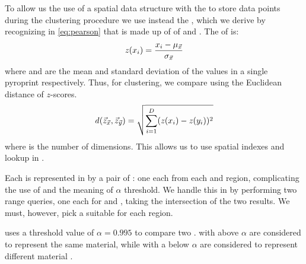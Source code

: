 To allow us the use of a spatial data structure with the \pearson{} to store data points during the clustering procedure we use instead the \clustplop{}, which we derive by recognizing in \autoref{eq:pearson} that \pearson{} is made up of \zscores{} of \pcveca{} and \pcvecb{}. 
The \zscore{} of \pcveca{} is:
\[
 \mathit{z}{}(x_i) = \frac{x_i - \mu_{\vec{x}}}{\sigma_{\vec{x}}}
\]
where \vecavg{\pca} and \vecstddev{\pca} are the mean and standard deviation of the values in a single pyroprint respectively. 
Thus, for clustering, we compare \pyros{} using the Euclidean distance \euczfunclabel{} of $z$-scores.
\begin{equation}\label{eq:euclidean_zscores}
 \mathit{d}{}(\vec{z}_{\vec{x}}, \vec{z}_{\vec{y}}) = \sqrt{ \sum_{i = 1}^{D}(\mathit{z}{}(x_i) - \mathit{z}{}(y_i))^2 } 
\end{equation}
where \numdims{} is the number of dimensions.
This allows us to use spatial indexes and  lookup in \dbscan{}.

Each \isol{} is represented in \cplop{} by a pair of \pyros{}: one each from each \Ssixt{} and \Sfive{} region, complicating the use of \dbscan{} and the meaning of $\alpha$ threshold.
We handle this in \dbscan{} by performing two range queries, one each for \Ssixt{} and \Sfive{}, taking the intersection of the two results.
We must, however, pick a suitable \eps{} for each \itsshort{} region.

\cplop{} uses a threshold value of $\alpha = 0.995$  to compare two \pyros{}.
\Pyros{} with \pearson{} above $\alpha$ are considered to represent the same \dna{} material, while \pyros{} with a \pearson{} below $\alpha$ are considered to represent different \dna{} material \cite{Shealy:SeniorProject, soliman2013cplop, SolimanDVMBNWKG12}.

